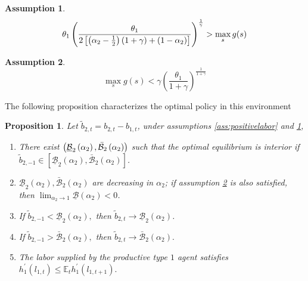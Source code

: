 \documentclass[thmsb,11pt]{article}
\newtheorem{assumption}{Assumption}
\newtheorem{proposition}{Proposition}
\begin{document}
{
\begin{assumption}
\label{ass:nonemptyinterior}
 \[\theta _{1}\left( \frac{\theta _{1}}{2\left[ \left(
\alpha _{2}-\frac{1}{2}\right) (1+\gamma )+(1-\alpha _{2})\right] }\right) ^{%
\frac{1}{\gamma }}>\max_{s}g(s)\]
\end{assumption}

\begin{assumption}
\label{ass:longrundebt}
 \[\max_{s}g(s) <\gamma \left(\frac{\theta_1}{1+\gamma}\right)^{\frac{1}{1+\gamma}} \]
 \end{assumption}

 The following proposition characterizes the optimal policy in this environment
\begin{proposition}
\label{prop: quasilinear noninterior} Let $\tilde b_{2,t} = b_{2,t}-b_{1,t}$, under assumptions \ref {ass:positivelabor} and \ref{ass:nonemptyinterior},
\begin{enumerate}
 \item There exist $\left( \underline{\mathcal{%
B}}_{2}\left( \alpha _{2}\right) ,\mathcal{\bar{\mathcal{B}}}_{2}\left(
\alpha _{2}\right) \right) $ such that  the optimal equilibrium is interior if $\tilde{b}%
_{2,-1}\in \left[ \underline{\mathcal{B}}_{2}\left( \alpha _{2}\right) ,%
\mathcal{\bar{\mathcal{B}}}_{2}\left( \alpha _{2}\right) \right] $.
\item  $\underline{\mathcal{B}}_{2}\left(
\alpha _{2}\right) ,\mathcal{\bar{\mathcal{B}}}_{2}\left( \alpha _{2}\right)
$ are decreasing in $\alpha _{2}$; if assumption \ref{ass:longrundebt} is also satisfied, then $\lim_{\alpha_2 \to 1 }{ \underline{\mathcal{B}}(\alpha_2)<0}$.
\item If $\tilde{b}_{2,-1}<\underline{\mathcal{B}}_{2}\left( \alpha _{2}\right) ,$
then $\tilde{b}_{2,t}\rightarrow \underline{\mathcal{B}}_{2}\left( \alpha
_{2}\right)$.
\item If $\tilde{b}_{2,-1}>\mathcal{\bar{B}}_{2}\left( \alpha
_{2}\right) ,$ then $\tilde{b}_{2,t}\rightarrow \mathcal{\bar{\mathcal{B}}}%
_{2}\left( \alpha _{2}\right) .$
\item The labor supplied by the productive type $1$ agent satisfies $h_{1}^{\prime }\left( l_{1,t}\right) \leq \mathbb{E}_{t}h_{1}^{\prime
}\left( l_{1,t+1}\right).
$
\end{enumerate}
\end{proposition}


}
\end{document}
